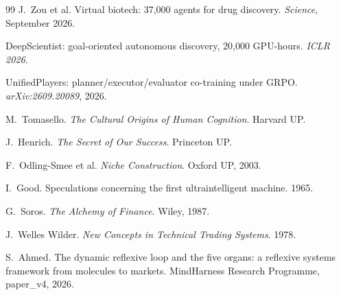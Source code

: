 \documentclass[11pt]{article}
\begin{document}
\begin{thebibliography}{99}
 J.\ Zou et al. Virtual biotech: 37,000 agents for drug discovery. \textit{Science}, September 2026.

 DeepScientist: goal-oriented autonomous discovery, 20,000 GPU-hours. \textit{ICLR 2026}.

 UnifiedPlayers: planner/executor/evaluator co-training under GRPO. \textit{arXiv:2609.20089}, 2026.

 M.\ Tomasello. \textit{The Cultural Origins of Human Cognition}. Harvard UP.

 J.\ Henrich. \textit{The Secret of Our Success}. Princeton UP.

 F.\ Odling-Smee et al. \textit{Niche Construction}. Oxford UP, 2003.

 I.\ Good. Speculations concerning the first ultraintelligent machine. 1965.

 G.\ Soros. \textit{The Alchemy of Finance}. Wiley, 1987.

 J.\ Welles Wilder. \textit{New Concepts in Technical Trading Systems}. 1978.

 S.\ Ahmed. The dynamic reflexive loop and the five organs: a reflexive systems framework from molecules to markets. MindHarness Research Programme, paper\_v4, 2026.

\end{thebibliography}
\end{document}
